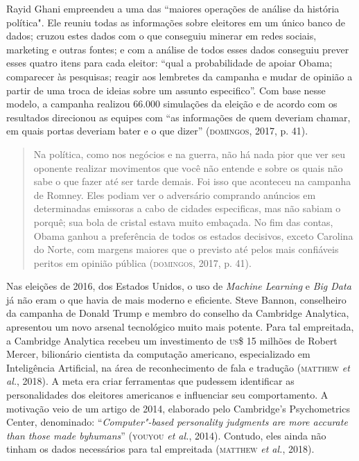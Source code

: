Rayid Ghani empreendeu a uma das ``maiores operações de análise da
história política". Ele reuniu todas as informações sobre eleitores em
um único banco de dados; cruzou estes dados com o que conseguiu minerar
em redes sociais, marketing e outras fontes; e com a análise de todos
esses dados conseguiu prever esses quatro itens para cada eleitor:
``qual a probabilidade de apoiar Obama; comparecer às pesquisas; reagir
aos lembretes da campanha e mudar de opinião a partir de uma troca de
ideias sobre um assunto especifico''. Com base nesse modelo, a campanha
realizou 66.000 simulações da eleição e de acordo com os resultados
direcionou as equipes com ``as informações de quem deveriam chamar, em
quais portas deveriam bater e o que dizer'' (\textsc{domingos}, 2017, p. 41).

\begin{quote}
Na política, como nos negócios e na guerra, não há nada pior que ver seu
oponente realizar movimentos que você não entende e sobre os quais não
sabe o que fazer até ser tarde demais. Foi isso que aconteceu na
campanha de Romney. Eles podiam ver o adversário comprando anúncios em
determinadas emissoras a cabo de cidades especificas, mas não sabiam o
porquê; sua bola de cristal estava muito embaçada. No fim das contas,
Obama ganhou a preferência de todos os estados decisivos, exceto
Carolina do Norte, com margens maiores que o previsto até pelos mais
confiáveis peritos em opinião pública (\textsc{domingos}, 2017, p. 41).
\end{quote}

Nas eleições de 2016, dos Estados Unidos, o uso de \emph{Machine
Learning} e \emph{Big Data} já não eram o que havia de mais moderno e
eficiente. Steve Bannon, conselheiro da campanha de Donald Trump e
membro do conselho da Cambridge Analytica, apresentou um novo arsenal
tecnológico muito mais potente. Para tal empreitada, a Cambridge
Analytica recebeu um investimento de \textsc{us}\$ 15 milhões de Robert Mercer,
bilionário cientista da computação americano, especializado em
Inteligência Artificial, na área de reconhecimento de fala e tradução (\textsc{matthew} \emph{et al.}, 2018). A meta era criar ferramentas que pudessem identificar as personalidades dos eleitores
americanos e influenciar seu comportamento. A motivação veio de um
artigo de 2014, elaborado pelo Cambridge's Psychometrics Center,
denominado: ``\emph{Computer"-based personality judgments are more
accurate than those made byhumans}'' (\textsc{youyou} \emph{et al.}, 2014). Contudo, eles
ainda não tinham os dados necessários para tal empreitada (\textsc{matthew} \emph{et
al.}, 2018).

